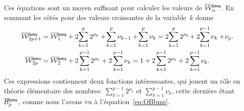 Ces équations sont un moyen suffisant pour calculer les valeurs de
\(\OW{\fun{bms}}{n}\). En sommant les côtés pour des valeurs
croissantes de la variable~\(k\) donne
\begin{align}
\OW{\fun{bms}}{2p+1}
 &= \OW{\fun{bms}}{1} + 2\!\sum_{k=1}^{p} 2^{\rho_k} +
    \!\sum_{k=1}^{p}\nu_{k-1} + \!\sum_{k=1}^p\nu_k
  = 2 \!\sum_{k=1}^{p} 2^{\rho_k}\! + 2\!\sum_{k=1}^{p-1}\nu_k +
    \!\nu_p.\label{eq:OWbms_2p_1}\\
\OW{\fun{bms}}{2p}
  &= \OW{\fun{bms}}{2} + 2\sum_{k=1}^{p-1}2^{\rho_k} +
2\sum_{k=1}^{p-1}\nu_k
  = 1 +  2\sum_{k=1}^{p-1}2^{\rho_k} + 2\sum_{k=1}^{p-1}\nu_k.
\label{eq:OWbms_2p}
\end{align}
Ces expressions contiennent deux fonctions intéressantes, qui jouent
un rôle en théorie élémentaire des nombres:
\(\sum_{k=1}^{p-1}2^{\rho_k}\) et \(\sum_{k=1}^{p-1}\nu_k\), cette
dernière étant \(\OB{\fun{bms}}{p}\), comme nous l'avons vu à
l'équation~\eqref{eq:OBbms}.  



